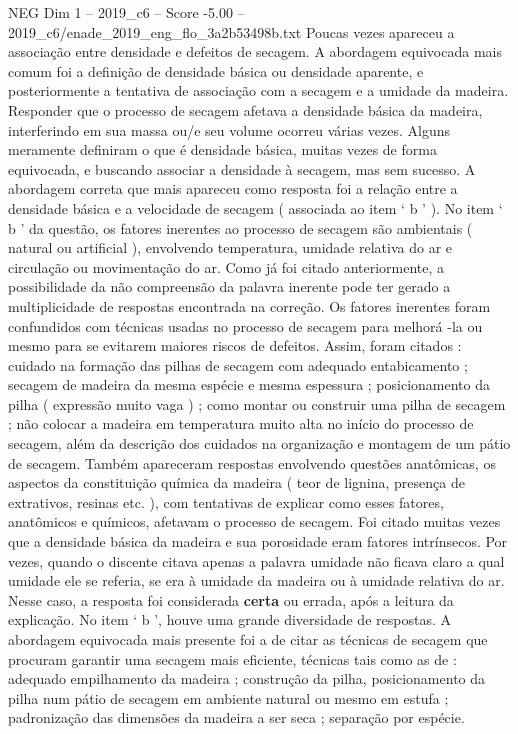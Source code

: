 \begin{textsample}{NEG Dim 1 – 2019\_c6 – Score -5.00 – 2019\_c6/enade\_2019\_eng\_flo\_3a2b53498b.txt}
Poucas vezes apareceu a associação entre densidade e defeitos de secagem.
A abordagem equivocada mais comum foi a definição de densidade básica ou densidade aparente, e posteriormente a tentativa de associação com a secagem e a umidade da madeira.
Responder que o processo de secagem afetava a densidade básica da madeira, interferindo em sua massa ou/e seu volume ocorreu várias vezes.
Alguns meramente definiram o que é densidade básica, muitas vezes de forma equivocada, e buscando associar a densidade à secagem, mas sem sucesso.
A abordagem correta que mais apareceu como resposta foi a relação entre a densidade básica e a velocidade de secagem ( associada ao item ‘ b ’ ).
No item ‘ b ’ da questão, os fatores inerentes ao processo de secagem são ambientais ( natural ou artificial ), envolvendo temperatura, umidade relativa do ar e circulação ou movimentação do ar.
Como já foi citado anteriormente, a possibilidade da não compreensão da palavra inerente pode ter gerado a multiplicidade de respostas encontrada na correção.
Os fatores inerentes foram confundidos com técnicas usadas no processo de secagem para melhorá -la ou mesmo para se evitarem maiores riscos de defeitos.
Assim, foram citados : cuidado na formação das pilhas de secagem com adequado entabicamento ; secagem de madeira da mesma espécie e mesma espessura ; posicionamento da pilha ( expressão muito vaga ) ; como montar ou construir uma pilha de secagem ; não colocar a madeira em temperatura muito alta no início do processo de secagem, além da descrição dos cuidados na organização e montagem de um pátio de secagem.
Também apareceram respostas envolvendo questões anatômicas, os aspectos da constituição química da madeira ( teor de lignina, presença de extrativos, resinas etc. ), com tentativas de explicar como esses fatores, anatômicos e químicos, afetavam o processo de secagem.
Foi citado muitas vezes que a densidade básica da madeira e sua porosidade eram fatores intrínsecos.
Por vezes, quando o discente citava apenas a palavra umidade não ficava claro a qual umidade ele se referia, se era à umidade da madeira ou à umidade relativa do ar.
Nesse caso, a resposta foi considerada \textbf{certa} ou errada, após a leitura da explicação.
No item ‘ b ’, houve uma grande diversidade de respostas.
A abordagem equivocada mais presente foi a de citar as técnicas de secagem que procuram garantir uma secagem mais eficiente, técnicas tais como as de : adequado empilhamento da madeira ; construção da pilha, posicionamento da pilha num pátio de secagem em ambiente natural ou mesmo em estufa ; padronização das dimensões da madeira a ser seca ; separação por espécie.

\end{textsample}
